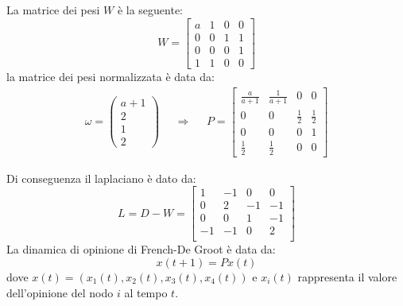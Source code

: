 \documentclass[11pt,largemargins]{homework}
\begin{document}
\section{}%
  \begin{alphaparts}
    \questionpart

    La matrice dei pesi \(W\) è la seguente:
    \begin{equation*}
      W=
      \begin{bmatrix}
        a & 1 & 0 & 0 \\
        0 & 0 & 1 & 1 \\
        0 & 0 & 0 & 1 \\
        1 & 1 & 0 & 0
      \end{bmatrix}
    \end{equation*}
    la matrice dei pesi normalizzata è data da:
    \begin{align*}
      \omega=\begin{pmatrix}
        a+1 \\ 2 \\ 1 \\ 2
      \end{pmatrix} && \Rightarrow &&
      P=\begin{bmatrix}
        \frac{a}{a+1} & \frac{1}{a+1} & 0 & 0 \\
        0 & 0 & \frac{1}{2} & \frac{1}{2} \\
        0 & 0 & 0 & 1 \\
        \frac{1}{2} & \frac{1}{2} & 0 & 0
      \end{bmatrix}
    \end{align*}

    Di conseguenza il laplaciano è dato da:
    \begin{equation*}
      L=D-W= \begin{bmatrix}
        1 & -1 & 0 & 0 \\
        0 & 2 & -1 & -1 \\
        0 & 0 & 1 & -1 \\
        -1 & -1 & 0 & 2 \\
      \end{bmatrix}
    \end{equation*}
    \questionpart
    La dinamica di opinione di French-De Groot è data da:
    \begin{equation*}
      x(t+1)=Px(t)
    \end{equation*}
    dove \(x(t)=(x_1(t),x_2(t),x_3(t),x_4(t))\) e \(x_i(t)\) rappresenta il valore dell'opinione del nodo \(i\) al tempo \(t\).


\end{alphaparts}
\end{document}
